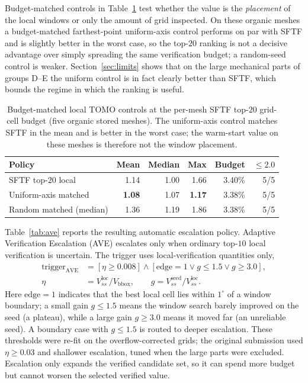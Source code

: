 \documentclass[11pt,a4paper]{article}
\begin{document}
Budget-matched controls in Table~\ref{tab:budget-matched-baseline} test whether the value is the \emph{placement} of the local windows or only the amount of grid inspected. On these organic meshes a budget-matched farthest-point uniform-axis control performs on par with SFTF and is slightly better in the worst case, so the top-$20$ ranking is not a decisive advantage over simply spreading the same verification budget; a random-seed control is weaker. Section~\ref{sec:limits} shows that on the large mechanical parts of groups D--E the uniform control is in fact clearly better than SFTF, which bounds the regime in which the ranking is useful.

\begin{table}[H]
\centering
\caption{Budget-matched local TOMO controls at the per-mesh SFTF top-$20$ grid-cell budget (five organic stored meshes).
The uniform-axis control matches SFTF in the mean and is better in the worst case; the warm-start value on these meshes is therefore not the window placement.}
\label{tab:budget-matched-baseline}
\small
\begin{tabular}{lrrrrr}
\toprule
Policy & Mean & Median & Max & Budget & $\le 2.0$\\
\midrule
SFTF top-$20$ local & 1.14 & 1.00 & 1.66 & 3.40\% & 5/5\\
Uniform-axis matched & \textbf{1.08} & 1.07 & \textbf{1.17} & 3.38\% & 5/5\\
Random matched (median) & 1.36 & 1.19 & 1.86 & 3.38\% & 5/5\\
\bottomrule
\end{tabular}
\end{table}

Table~\ref{tab:ave} reports the resulting automatic escalation policy. Adaptive Verification Escalation (AVE) escalates only when ordinary top-$10$ local verification is uncertain. The trigger uses local-verification quantities only,
\begin{equation}
\begin{aligned}
\mathrm{trigger}_{\mathrm{AVE}}
&=[\eta\ge0.008]\wedge[\mathrm{edge}=1\vee g\le1.5\vee g\ge3.0],\\
\eta&=V_{ss}^{\mathrm{loc}}/V_{\mathrm{bbox}},\qquad
 g=V_{ss}^{\mathrm{seed}}/V_{ss}^{\mathrm{loc}}.
\end{aligned}
\label{eq:ave-trigger}
\end{equation}
Here $\mathrm{edge}=1$ indicates that the best local cell lies within $1^\circ$ of a window boundary; a small gain $g\le1.5$ means the window search barely improved on the seed (a plateau), while a large gain $g\ge3.0$ means it moved far (an unreliable seed). A boundary case with $g\le1.5$ is routed to deeper escalation. These thresholds were re-fit on the overflow-corrected grids; the original submission used $\eta\ge0.03$ and shallower escalation, tuned when the large parts were excluded. Escalation only expands the verified candidate set, so it can spend more budget but cannot worsen the selected verified value.
\end{document}
